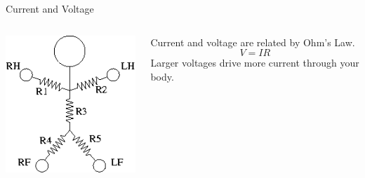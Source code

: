 \documentclass{presentation}
\begin{document}
\begin{frame}{Current and Voltage}
  \begin{columns}
    \begin{column}{0.33\textwidth}
      \includegraphics[width=\textwidth]{"./resistor-person.png"}
    \end{column}
    \begin{column}{0.67\textwidth}
      Current and voltage are related by Ohm's Law.
      \begin{equation*}
        V = IR
      \end{equation*}
      Larger voltages drive more current through your body.
    \end{column}
  \end{columns}
\end{frame}
\end{document}
